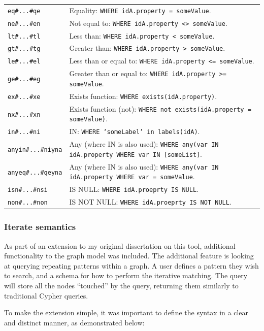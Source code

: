 \documentclass[letterpaper]{ltxdoc}
\begin{document}
\begin{center}
\begin{tabular}{ p{2.5cm} p{11cm} }
\texttt{eq\#...\#qe} & Equality: \texttt{WHERE idA.property = someValue}. \\
\texttt{ne\#...\#en} & Not equal to: \texttt{WHERE idA.property <> someValue}. \\
\texttt{lt\#...\#tl} & Less than: \texttt{WHERE idA.property < someValue}. \\
\texttt{gt\#...\#tg} & Greater than: \texttt{WHERE idA.property > someValue}. \\
\texttt{le\#...\#el} & Less than or equal to: \texttt{WHERE idA.property <= someValue}. \\
\texttt{ge\#...\#eg} & Greater than or equal to: \texttt{WHERE idA.property >= someValue}. \\
\texttt{ex\#...\#xe} & Exists function: \texttt{WHERE exists(idA.property)}. \\
\texttt{nx\#...\#xn} & Exists function (not): \texttt{WHERE not exists(idA.property = someValue)}. \\
\texttt{in\#...\#ni} & IN: \texttt{WHERE `someLabel' in labels(idA)}. \\
\texttt{anyin\#...\#niyna} & Any (where IN is also used): \texttt{WHERE any(var IN idA.property WHERE var IN [someList]}. \\
\texttt{anyeq\#...\#qeyna} & Any (where IN is also used): \texttt{WHERE any(var IN idA.property WHERE var = someValue}. \\
\texttt{isn\#...\#nsi} & IS NULL: \texttt{WHERE idA.proeprty IS NULL}. \\
\texttt{non\#...\#non} & IS NOT NULL: \texttt{WHERE idA.proeprty IS NOT NULL}.
\end{tabular}
\end{center}


\subsubsection{Iterate semantics}
\label{sssec:iterate}
As part of an extension to my original dissertation on this tool, additional functionality to the graph model was included. The additional feature is looking at querying repeating patterns within a graph. A user defines a pattern they wish to search, and a schema for how to perform the iterative matching. The query will store all the nodes “touched” by the query, returning them similarly to traditional Cypher queries.

To make the extension simple, it was important to define the syntax in a clear and distinct manner, as demonstrated below:
\end{document}
